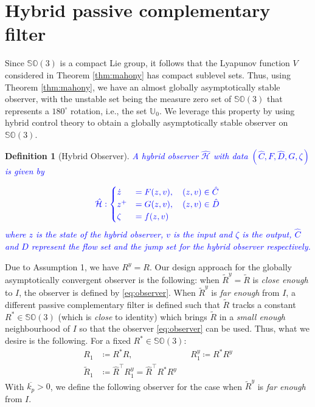 \documentclass{article}
\newcommand{\SOthree}{\mathbb{SO}(3)}
\newtheorem{definition}{Definition}
\newcommand{\textblue}[1]{\textcolor{blue}{#1}}
\newcommand{\Rtilde}{\tilde{R}}
\newcommand{\Rstar}{{R^*}}
\begin{document}

\section{Hybrid passive complementary filter}

{Since $\SOthree$ is a compact Lie group, it follows that the Lyapunov function $V$ considered in Theorem \ref{thm:mahony} has compact sublevel sets.} Thus, using Theorem \ref{thm:mahony}, we have an almost globally asymptotically stable observer, with the unstable set being the measure zero set of $\SOthree$ that represents a $180^\circ$ rotation, i.e., the set $\mathbb{U}_0$. We leverage this property by using hybrid control theory to obtain a globally asymptotically stable observer on $\SOthree$. 

\begin{definition}[Hybrid Observer]
    \textblue{A hybrid observer $\hat{\mathcal{H}}$ with data $(\hat{C}, F, \hat{D}, G, \zeta)$ is given by}

\begin{alignat}{3}
    \textblue{\hat{\mathcal{H}} :  \begin{cases}
        \dot{z} &= F(z, v), \quad (z, v) \in \hat{C}\\
        z^+ &= G(z, v), \quad (z, v)\in \hat{D}\\
        \zeta &= f(z, v)
    \end{cases}}
\end{alignat}
\textblue{where $z$ is the state of the hybrid observer, $v$ is the input and $\zeta$ is the output, $\hat{C}$ and $\hat{D}$ represent the flow set and the jump set for the hybrid observer respectively. }
\end{definition}

Due to Assumption 1, we have $R^y = R$. Our design approach for the globally asymptotically convergent observer is the following: when {$\Rtilde^y = \Rtilde$} is \emph{close enough} to $I$, the observer is defined by \eqref{eq:observer}. When ${\Rtilde^y}$ is \emph{far enough} from $I$, a different passive complementary filter is defined such that $\Rtilde$ tracks a constant $\Rstar\in\SOthree$ (which is \emph{close} to identity) which brings $\Rtilde$ in a \emph{small enough} neighbourhood of $I$ so that the observer \eqref{eq:observer} can be used. Thus, what we desire is the following. For a fixed $\Rstar\in \SOthree$:
\begin{subequations}
\begin{align}
    R_1 &\coloneqq \Rstar R, && R_1^y \coloneqq \Rstar R^y\\
    \Rtilde_1 &\coloneqq \hat{R}^\top R^y_1 = \hat{R}^\top \Rstar R^y
\end{align}
\end{subequations}
With $\overline{k_p}>0$, we define the following observer for the case when $\Rtilde^y$ is \emph{far enough} from $I$. 
\end{document}
